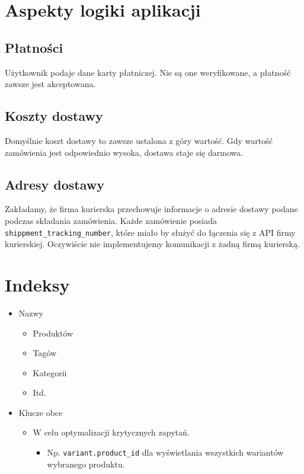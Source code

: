 \section*{Aspekty logiki aplikacji}
\subsection*{Płatności}
Użytkownik podaje dane karty płatniczej. Nie są one weryfikowane, a płatność zawsze jest akceptowana.

\subsection*{Koszty dostawy}
Domyślnie koszt dostawy to zawsze ustalona z góry wartość. Gdy wartość zamówienia jest odpowiednio wysoka, dostawa staje się darmowa.

\subsection*{Adresy dostawy}
Zakładamy, że firma kurierska przechowuje informacje o adresie dostawy podane podczas składania zamówienia. Każde zamówienie posiada \texttt{shippment\_tracking\_number}, które miało by służyć do łączenia się z API firmy kurierskiej. Oczywiście nie implementujemy komunikacji z żadną firmą kurierską.

\section*{Indeksy}
\begin{itemize}
    \item Nazwy
        \begin{itemize}
            \item Produktów
            \item Tagów
            \item Kategorii
            \item Itd.
        \end{itemize}
    \item Klucze obce
        \begin{itemize}
            \item W celu optymalizacji krytycznych zapytań.
                    \begin{itemize}
                        \item Np. \texttt{variant.product\_id} dla wyświetlania wszystkich wariantów wybranego produktu.
                    \end{itemize}
        \end{itemize}
\end{itemize}

